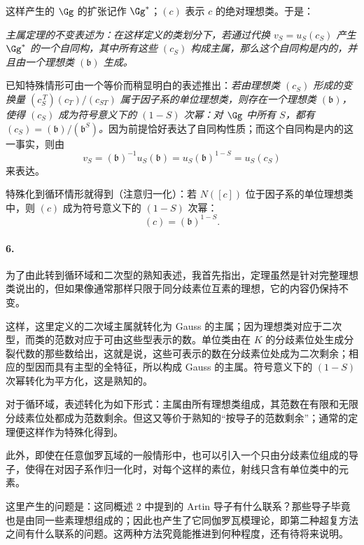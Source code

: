 这样产生的 \(\Gg\) 的扩张记作 \(\Gg^\ast\)；\((c)\) 表示 \(c\) 的绝对理想类。于是：

\emph{主属定理的不变表述为：在这样定义的类划分下，若通过代换 \(v_S=u_S(c_S)\) 产生 \(\Gg^\ast\) 的一个自同构，其中所有这些 \((c_S)\) 构成主属，那么这个自同构是内的，并且由一个理想类 \((\mathfrak b)\) 生成。}

已知特殊情形可由一个等价而稍显明白的表述推出：\emph{若由理想类 \((c_S)\) 形成的变换量 \((c_S^{\,T})(c_T)/(c_{ST})\) 属于因子系的单位理想类，则存在一个理想类 \((\mathfrak b)\)，使得 \((c_S)\) 成为符号意义下的 \((1-S)\) 次幂：对 \(\Gg\) 中所有 \(S\)，都有 \((c_S)=(\mathfrak b)/(\mathfrak b^{S})\)。}因为前提恰好表达了自同构性质；而这个自同构是内的这一事实，则由
\[
        v_S=(\mathfrak b)^{-1}u_S(\mathfrak b)
        =u_S(\mathfrak b)^{1-S}=u_S(c_S)
\]
来表达。

特殊化到循环情形就得到（注意归一化）：若 \(N([c])\) 位于因子系的单位理想类中，则 \((c)\) 成为符号意义下的 \((1-S)\) 次幂：
\[
        (c)=(\mathfrak b)^{1-S}.
\]

\paragraph{6.}
为了由此转到循环域和二次型的熟知表述，我首先指出，定理虽然是针对完整理想类说出的，但如果像通常那样只限于同分歧素位互素的理想，它的内容仍保持不变。

这样，这里定义的二次域主属就转化为 Gauss 的主属；因为理想类对应于二次型，而类的范数对应于可由这些型表示的数。单位类由在 \(K\) 的分歧素位处生成分裂代数的那些数给出，这就是说，这些可表示的数在分歧素位处成为二次剩余；相应的型因而具有主型的全特征，所以构成 Gauss 的主属。符号意义下的 \((1-S)\) 次幂转化为平方化，这是熟知的。

对于循环域，表述转化为如下形式：主属由所有理想类组成，其范数在有限和无限分歧素位处都成为范数剩余。但这又等价于熟知的“按导子的范数剩余”；通常的定理便这样作为特殊化得到。

此外，即使在任意伽罗瓦域的一般情形中，也可以引入一个只由分歧素位组成的导子，使得在对因子系作归一化时，对每个这样的素位，射线只含有单位类中的元素。

这里产生的问题是：这同概述 2 中提到的 Artin 导子有什么联系？那些导子毕竟也是由同一些素理想组成的；因此也产生了它同伽罗瓦模理论，即第二种超复方法之间有什么联系的问题。这两种方法究竟能推进到何种程度，还有待将来说明。

\clearpage
\setcounter{footnote}{0}


